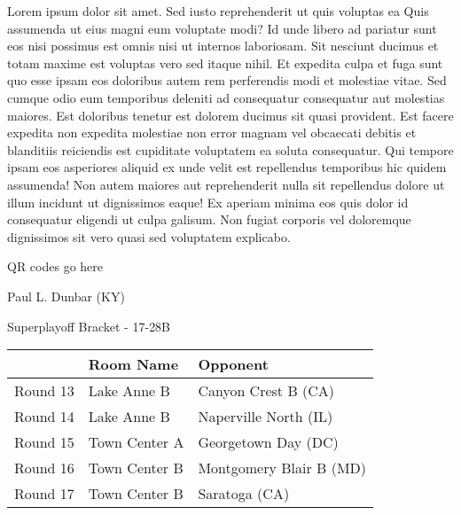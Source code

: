\documentclass{article}%
\begin{document}
\vspace*{8pt}%
\linebreak%
\newline%
\newline%
Lorem ipsum dolor sit amet. Sed iusto reprehenderit ut quis voluptas ea Quis assumenda ut eius magni eum voluptate modi? Id unde libero ad pariatur sunt eos nisi possimus est omnis nisi ut internos laboriosam. Sit nesciunt ducimus et totam maxime est voluptas vero sed itaque nihil. Et expedita culpa et fuga sunt quo esse ipsam eos doloribus autem rem perferendis modi et molestiae vitae.\newline%
\newline%
Sed cumque odio eum temporibus deleniti ad consequatur consequatur aut molestias maiores. Est doloribus tenetur est dolorem ducimus sit quasi provident. Est facere expedita non expedita molestiae non error magnam vel obcaecati debitis et blanditiis reiciendis est cupiditate voluptatem ea soluta consequatur. Qui tempore ipsam eos asperiores aliquid ex unde velit est repellendus temporibus hic quidem assumenda!\newline%
\newline%
Non autem maiores aut reprehenderit nulla sit repellendus dolore ut illum incidunt ut dignissimos eaque! Ex aperiam minima eos quis dolor id consequatur eligendi ut culpa galisum. Non fugiat corporis vel doloremque dignissimos sit vero quasi sed voluptatem explicabo.\newline%
\newline%
%
\vspace*{30pt}%
\begin{center}%
\begin{Huge}%
QR codes go here%
\end{Huge}%
\end{center}%
\newpage%
\begin{center}%
\begin{Huge}%
Paul L. Dunbar (KY)%
\end{Huge}%
\vspace*{8pt}%
\linebreak%
\begin{Large}%
Superplayoff Bracket {-} 17{-}28B%
\end{Large}%
\end{center}%
%
\begin{tabularx}{\textwidth}{|c|Y|Y|}%
\hline%
&Room Name&Opponent\\%
\hline%
Round 13&Lake Anne B&Canyon Crest B (CA)\\%
Round 14&Lake Anne B&Naperville North (IL)\\%
Round 15&Town Center A&Georgetown Day (DC)\\%
Round 16&Town Center B&Montgomery Blair B (MD)\\%
Round 17&Town Center B&Saratoga (CA)\\%
\hline%
\end{tabularx}%
\end{document}
